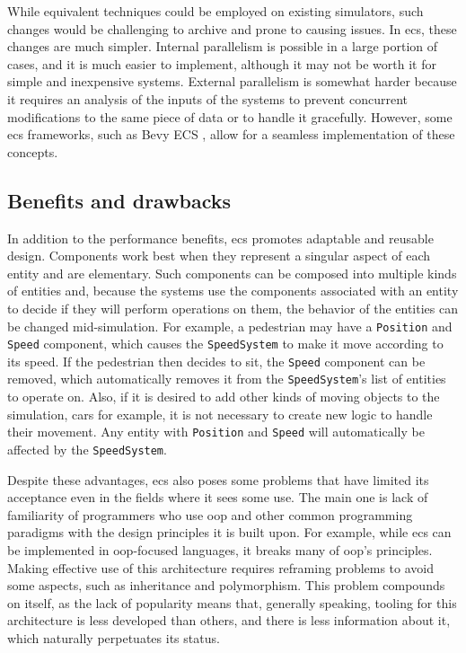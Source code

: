\documentclass[twoside, 11pt]{article}
\begin{document}
While equivalent techniques could be employed on existing simulators, such changes would be challenging to archive and prone to causing issues. In \gls{ecs}, these changes are much simpler. Internal parallelism is possible in a large portion of cases, and it is much easier to implement, although it may not be worth it for simple and inexpensive systems. External parallelism is somewhat harder because it requires an analysis of the inputs of the systems to prevent concurrent modifications to the same piece of data or to handle it gracefully. However, some \gls{ecs} frameworks, such as Bevy ECS \cite{bevy}, allow for a seamless implementation of these concepts.

\subsection{Benefits and drawbacks}

In addition to the performance benefits, \gls{ecs} promotes adaptable and reusable design. Components work best when they represent a singular aspect of each entity and are elementary. Such components can be composed into multiple kinds of entities and, because the systems use the components associated with an entity to decide if they will perform operations on them, the behavior of the entities can be changed mid-simulation. For example, a pedestrian may have a \verb|Position| and \verb|Speed| component, which causes the \verb|SpeedSystem| to make it move according to its speed. If the pedestrian then decides to sit, the \verb|Speed| component can be removed, which automatically removes it from the \verb|SpeedSystem|'s list of entities to operate on. Also, if it is desired to add other kinds of moving objects to the simulation, cars for example, it is not necessary to create new logic to handle their movement. Any entity with \verb|Position| and \verb|Speed| will automatically be affected by the \verb|SpeedSystem|.

Despite these advantages, \gls{ecs} also poses some problems that have limited its acceptance even in the fields where it sees some use. The main one is lack of familiarity of programmers who use \gls{oop} and other common programming paradigms with the design principles it is built upon. For example, while \gls{ecs} can be implemented in \gls{oop}-focused languages, it breaks many of \gls{oop}'s principles. Making effective use of this architecture requires reframing problems to avoid some aspects, such as inheritance and polymorphism. This problem compounds on itself, as the lack of popularity means that, generally speaking, tooling for this architecture is less developed than others, and there is less information about it, which naturally perpetuates its status.
\end{document}
